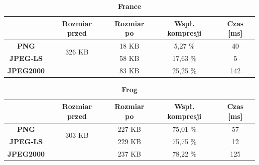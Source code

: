 \begin{table}[!h]
	\centering
	\caption{\textbf{France}}
	\label{my-label}
	\begin{tabular}{|c|c|c|c|c|}                                             
		\hline
		& \textbf{Rozmiar przed} & \textbf{Rozmiar po} & \textbf{Wspł. kompresji} & \textbf{Czas {[}ms{]}} \\ \hline 
		\textbf{PNG}      &          \multicolumn{1}{c|}{\multirow{2}{*}{326 KB}}             &     18  KB              &    5,27 \%                     &            40                 \\\cline{3-5}
		\textbf{JPEG-LS}  &                        &        58 KB             &       17,63 \%                  &          5                \\\cline{3-5}
		\textbf{JPEG2000} &                        &     83 KB                &      25,25 \%                   &         142             \\ \hline
	\end{tabular}
\end{table}

\begin{table}[!h]
	\centering
	\caption{\textbf{Frog}}
	\label{my-label}
	\begin{tabular}{|c|c|c|c|c|}                                             
		\hline
		& \textbf{Rozmiar przed} & \textbf{Rozmiar po} & \textbf{Wspł. kompresji} & \textbf{Czas {[}ms{]}} \\ \hline 
		\textbf{PNG}      &          \multicolumn{1}{c|}{\multirow{2}{*}{303 KB}}             &        227 KB             &    75,01 \%                     &           57                  \\\cline{3-5}
		\textbf{JPEG-LS}  &                        &      229 KB               &       75,75 \%                  &         12                 \\\cline{3-5}
		\textbf{JPEG2000} &                        &      237 KB               &       78,22 \%                  &      125                \\ \hline
	\end{tabular}
\end{table}

